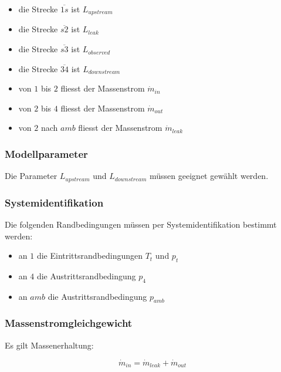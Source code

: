 \documentclass[a4paper,10pt,twocolumn]{article}
\begin{document}
\begin{itemize}
\item die Strecke $\overline{1s}$ ist $L_\mathit{upstream}$
\item die Strecke $\overline{s2}$ ist $L_\mathit{leak}$
\item die Strecke $\overline{s3}$ ist $L_\mathit{observed}$
\item die Strecke $\overline{34}$ ist $L_\mathit{downstream}$
\item von $1$ bis $2$ fliesst der Massenstrom $\dot m_\textit{in}$
\item von $2$ bis $4$ fliesst der Massenstrom $\dot m_\textit{out}$
\item von $2$ nach $\mathit{amb}$ fliesst der Massenstrom $\dot m_\textit{leak}$
\end{itemize}

\subsubsection{Modellparameter}

Die Parameter $L_\mathit{upstream}$ und $L_\mathit{downstream}$ müssen geeignet gewählt werden.


\subsubsection{Systemidentifikation}

Die folgenden Randbedingungen müssen per Systemidentifikation bestimmt werden:

\begin{itemize}
\item an $1$ die Eintrittsrandbedingungen $T_t$ und $p_t$
\item an $4$ die Austrittsrandbedingung $p_4$
\item an $\mathit{amb}$ die Austrittsrandbedingung $p_\mathit{amb}$
\end{itemize}

\subsubsection{Massenstromgleichgewicht}

Es gilt Massenerhaltung:

\begin{equation}
\dot m_\textit{in} = \dot m_\textit{leak} + \dot m_\textit{out} \label{eq:massenerhaltung}
\end{equation}
\end{document}
